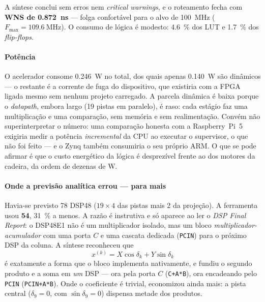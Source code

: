 \documentclass[conference]{IEEEtran}
\begin{document}
A s\'intese conclui sem erros nem \emph{critical warnings}, e o roteamento fecha
com \textbf{WNS de \SI{+0.872}{\nano\second}} --- folga confort\'avel para o alvo
de \SI{100}{\mega\hertz} ($F_{\max} = \SI{109.6}{\mega\hertz}$). O consumo de
l\'ogica \'e modesto: \SI{4.6}{\percent} dos LUT e \SI{1.7}{\percent} dos
\emph{flip-flops}.

\paragraph{Pot\^encia}
O acelerador consome \SI{0.246}{\watt} no total, dos quais apenas
\SI{0.140}{\watt} s\~ao din\^amicos --- o restante \'e a corrente de fuga do
dispositivo, que existiria com a FPGA ligada mesmo sem nenhum projeto carregado.
A parcela din\^amica \'e baixa porque o \emph{datapath}, embora largo (\num{19}
pistas em paralelo), \'e raso: cada est\'agio faz uma multiplica\c{c}\~ao e uma
compara\c{c}\~ao, sem mem\'oria e sem realimenta\c{c}\~ao. Convém n\~ao
superinterpretar o n\'umero: uma compara\c{c}\~ao honesta com a Raspberry~Pi~5
exigiria medir a pot\^encia \emph{incremental} da CPU ao executar o supervisor, o
que n\~ao foi feito --- e o Zynq tamb\'em consumiria o seu pr\'oprio ARM. O que se
pode afirmar \'e que o custo energ\'etico da l\'ogica \'e desprez\'ivel frente ao
dos motores da cadeira, da ordem de dezenas de \si{\watt}.

\paragraph{Onde a previs\~ao anal\'itica errou --- para mais}
Havia-se previsto \num{78} DSP48 ($19\times4$ das pistas mais \num{2} da
proje\c{c}\~ao). A ferramenta usou \textbf{\num{54}}, \SI{31}{\percent} a menos.
A raz\~ao \'e instrutiva e s\'o aparece ao ler o \emph{DSP Final Report}: o
DSP48E1 n\~ao \'e um multiplicador isolado, mas um bloco
\emph{multiplicador-acumulador} com uma porta $C$ e uma cascata dedicada
(\texttt{PCIN}) para o pr\'oximo DSP da coluna. A s\'intese reconheceu que
\begin{equation*}
x^{(k)} = X\cos\delta_k + Y\sin\delta_k
\end{equation*}
\noindent \'e exatamente a forma que o bloco implementa nativamente, e fundiu o
segundo produto e a soma em \emph{um} DSP --- ora pela porta $C$
(\texttt{C+A*B}), ora encadeando pelo \texttt{PCIN} (\texttt{PCIN+A*B}). Onde o
coeficiente \'e trivial, economizou ainda mais: a pista central ($\delta_9=0$,
com $\sin\delta_9 = 0$) dispensa metade dos produtos.
\end{document}
